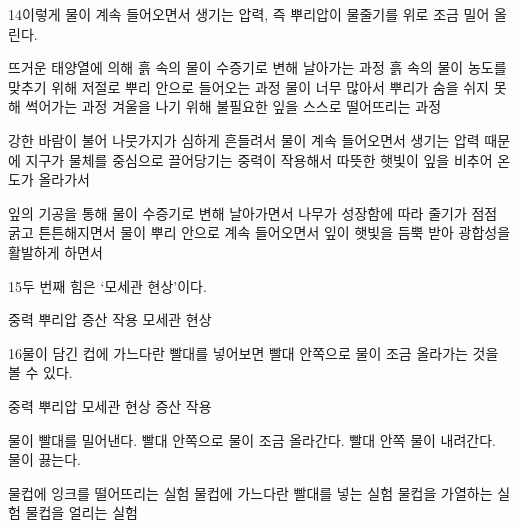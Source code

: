 \documentclass[fs85,seriesRus]{korfarm-base}
\begin{document}
\begin{kfSentenceUnit}{14}{이렇게 물이 계속 들어오면서 생기는 압력, 즉 뿌리압이 물줄기를 위로 조금 밀어 올린다.}
\begin{kfChoices}
\kfChoice 뜨거운 태양열에 의해 흙 속의 물이 수증기로 변해 날아가는 과정
\kfChoice 흙 속의 물이 농도를 맞추기 위해 저절로 뿌리 안으로 들어오는 과정
\kfChoice 물이 너무 많아서 뿌리가 숨을 쉬지 못해 썩어가는 과정
\kfChoice 겨울을 나기 위해 불필요한 잎을 스스로 떨어뜨리는 과정
\end{kfChoices}
\begin{kfChoices}
\kfChoice 강한 바람이 불어 나뭇가지가 심하게 흔들려서
\kfChoice 물이 계속 들어오면서 생기는 압력 때문에
\kfChoice 지구가 물체를 중심으로 끌어당기는 중력이 작용해서
\kfChoice 따뜻한 햇빛이 잎을 비추어 온도가 올라가서
\end{kfChoices}
\begin{kfChoices}
\kfChoice 잎의 기공을 통해 물이 수증기로 변해 날아가면서
\kfChoice 나무가 성장함에 따라 줄기가 점점 굵고 튼튼해지면서
\kfChoice 물이 뿌리 안으로 계속 들어오면서
\kfChoice 잎이 햇빛을 듬뿍 받아 광합성을 활발하게 하면서
\end{kfChoices}
\end{kfSentenceUnit}

\begin{kfSentenceUnit}{15}{두 번째 힘은 ‘모세관 현상’이다.}
\begin{kfChoices}
\kfChoice 중력
\kfChoice 뿌리압
\kfChoice 증산 작용
\kfChoice 모세관 현상
\end{kfChoices}
\end{kfSentenceUnit}

\begin{kfSentenceUnit}{16}{물이 담긴 컵에 가느다란 빨대를 넣어보면 빨대 안쪽으로 물이 조금 올라가는 것을 볼 수 있다.}
\begin{kfChoices}
\kfChoice 중력
\kfChoice 뿌리압
\kfChoice 모세관 현상
\kfChoice 증산 작용
\end{kfChoices}
\begin{kfChoices}
\kfChoice 물이 빨대를 밀어낸다.
\kfChoice 빨대 안쪽으로 물이 조금 올라간다.
\kfChoice 빨대 안쪽 물이 내려간다.
\kfChoice 물이 끓는다.
\end{kfChoices}
\begin{kfChoices}
\kfChoice 물컵에 잉크를 떨어뜨리는 실험
\kfChoice 물컵에 가느다란 빨대를 넣는 실험
\kfChoice 물컵을 가열하는 실험
\kfChoice 물컵을 얼리는 실험
\end{kfChoices}
\end{kfSentenceUnit}
\end{document}
